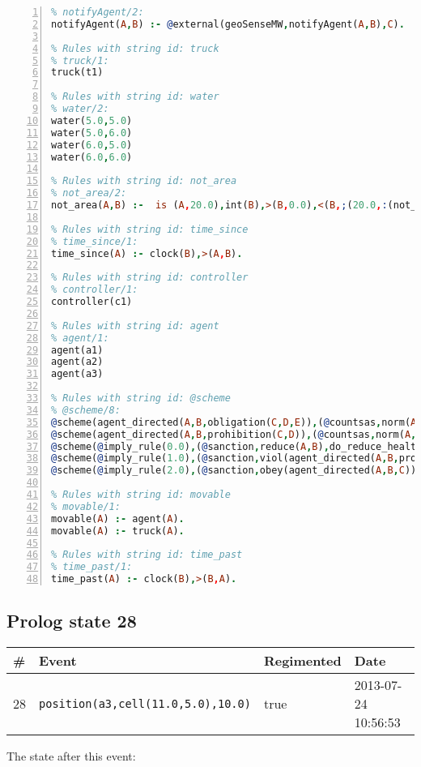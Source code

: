 \documentclass[11pt]{article}\usepackage[utf8]{inputenc}\usepackage{geometry}
\begin{document}
\begin{lstlisting}[language=Prolog, numbers=left]
% Rules with string id: notifyAgent
% notifyAgent/2:
notifyAgent(A,B) :- @external(geoSenseMW,notifyAgent(A,B),C).

% Rules with string id: truck
% truck/1:
truck(t1)

% Rules with string id: water
% water/2:
water(5.0,5.0)
water(5.0,6.0)
water(6.0,5.0)
water(6.0,6.0)

% Rules with string id: not_area
% not_area/2:
not_area(A,B) :-  is (A,20.0),int(B),>(B,0.0),<(B,;(20.0,:(not_area(A,B), is (-(B),20.0)))),int(A),>(A,0.0),<(A,;(20.0,:(area(A,B),-(int(A))))),int(B),>(A,0.0),>(B,0.0),<(A,21.0),<(B,21.0).

% Rules with string id: time_since
% time_since/1:
time_since(A) :- clock(B),>(A,B).

% Rules with string id: controller
% controller/1:
controller(c1)

% Rules with string id: agent
% agent/1:
agent(a1)
agent(a2)
agent(a3)

% Rules with string id: @scheme
% @scheme/8:
@scheme(agent_directed(A,B,obligation(C,D,E)),(@countsas,norm(A,B,F,obligation(C,D,E)),F),false,(listTrue(C)),(time_past(D)),false,[plus(viol(agent_directed(A,B,obligation(C,D,E))))|[]],[plus(obey(agent_directed(A,B,obligation(C,D,E))))|[]])
@scheme(agent_directed(A,B,prohibition(C,D)),(@countsas,norm(A,B,E,prohibition(C,D)),E),(listTrue(C)),false,(false),false,[plus(viol(agent_directed(A,B,prohibition(C,D))))|[]],[plus(obey(agent_directed(A,B,prohibition(C,D))))|[]])
@scheme(@imply_rule(0.0),(@sanction,reduce(A,B),do_reduce_health(A,B),notifyAgent(A,changed(status))),true,false,false,false,[min(reduce(A,B))|[]],[])
@scheme(@imply_rule(1.0),(@sanction,viol(agent_directed(A,B,prohibition(C,D))),do_sanction(D)),true,false,false,false,[min(viol(agent_directed(A,B,prohibition(C,D))))|[]],[])
@scheme(@imply_rule(2.0),(@sanction,obey(agent_directed(A,B,C))),true,false,false,false,[min(obey(agent_directed(A,B,C)))|[]],[])

% Rules with string id: movable
% movable/1:
movable(A) :- agent(A).
movable(A) :- truck(A).

% Rules with string id: time_past
% time_past/1:
time_past(A) :- clock(B),>(B,A).

\end{lstlisting}
\clearpage 
\subsection{Prolog state 28}
\begin{table}[ht]
\centering 
\begin{tabular}{l l l l} 
\textbf{\#} & \textbf{Event} & \textbf{Regimented} & \textbf{Date} \\ [0.5ex] 
\hline
28&\texttt{position(a3,cell(11.0,5.0),10.0)}&true&2013-07-24 10:56:53\\ [1ex] \hline\end{tabular}
\end{table}
The state after this event:
\end{document}
